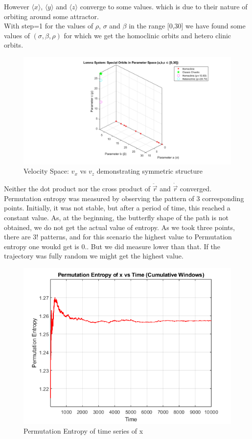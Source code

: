 \documentclass[%
reprint,
amsmath,amssymb,
aps,
floatfix,
]{revtex4-2}
\begin{document}
	\FloatBarrier
	However $\langle x\rangle$, $\langle y\rangle$ and  $\langle z\rangle$ converge to some values. which is due to their nature of orbiting around some attractor. \\
	With step=1 for the values of $\rho$, $\sigma$ and $\beta$ in the range [0,30] we have found some values of $(\sigma, \beta, \rho )$ for which we get the homoclinic orbits and hetero clinic orbits.
	\FloatBarrier
	\begin{figure}[htbp]
		\centering
		\includegraphics[width=0.8\linewidth]{homoclinic_heteroclinic_points.png}
		\caption{Velocity Space: $v_x$ vs $v_z$ demonstrating symmetric structure}
		\label{fig:vx_vz}
	\end{figure}
	\FloatBarrier
	Neither the dot product nor the cross product of $\ddot{\vec{r}}$ and $\dot{\vec{r}}$ converged.\\
	Permutation entropy was measured by observing the pattern of 3 corresponding points. Initially, it was not stable, but after a period of time, this reached a constant value. As, at the beginning, the butterfly shape of the path is not obtained, we do not get the actual value of entropy. As we took three points, there are $3!$ patterns, and for this scenario the highest value to Permutation entropy one woukd get is $0.$. But we did measure lower than that. If the trajectory was fully random we might get the highest value.
	\begin{figure}[htbp]
		\centering
		\includegraphics[width=0.8\linewidth]{PE_vs_time_x.png}
		\caption{Permutation Entropy of time series of x}
		\label{fig:vx_vz}
	\end{figure}
\end{document}
